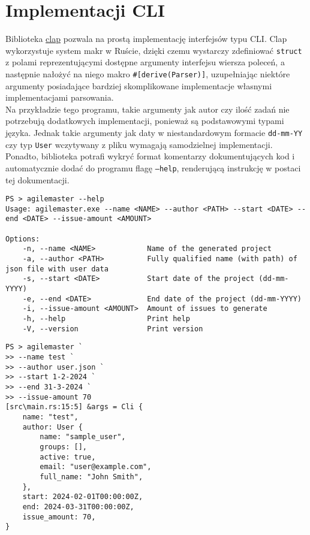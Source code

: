\section{Implementacji CLI}
Biblioteka \href{https://docs.rs/clap/latest/clap/}{clap} pozwala na prostą implementację interfejsów typu CLI.
Clap wykorzystuje system makr w Ruście, dzięki czemu wystarczy zdefiniować \texttt{struct} z polami reprezentującymi
dostępne argumenty interfejsu wiersza poleceń, a następnie nałożyć na niego makro \texttt{\#[derive(Parser)]}, uzupełniając niektóre
argumenty posiadające bardziej skomplikowane implementacje własnymi implementacjami parsowania.\\
Na przykładzie tego programu, takie argumenty jak autor czy ilość zadań nie potrzebują dodatkowych implementacji, ponieważ są podstawowymi typami języka.
Jednak takie argumenty jak daty w niestandardowym formacie \texttt{dd-mm-YY} czy typ \texttt{User} wczytywany z pliku wymagają
samodzielnej implementacji.\\
Ponadto, biblioteka potrafi wykryć format komentarzy dokumentujących kod i automatycznie dodać do programu flagę \texttt{--help}, renderującą instrukcję
w postaci tej dokumentacji.\\

\begin{lstlisting}[caption=Instrukcja użycia CLI programu]
PS > agilemaster --help
Usage: agilemaster.exe --name <NAME> --author <PATH> --start <DATE> --end <DATE> --issue-amount <AMOUNT>

Options:
    -n, --name <NAME>            Name of the generated project
    -a, --author <PATH>          Fully qualified name (with path) of json file with user data
    -s, --start <DATE>           Start date of the project (dd-mm-YYYY)
    -e, --end <DATE>             End date of the project (dd-mm-YYYY)
    -i, --issue-amount <AMOUNT>  Amount of issues to generate
    -h, --help                   Print help
    -V, --version                Print version
\end{lstlisting}

\begin{lstlisting}[caption=Przykład użycia programu]
PS > agilemaster `
>> --name test `
>> --author user.json `
>> --start 1-2-2024 `
>> --end 31-3-2024 `
>> --issue-amount 70
[src\main.rs:15:5] &args = Cli {
    name: "test",
    author: User {
        name: "sample_user",
        groups: [],
        active: true,
        email: "user@example.com",
        full_name: "John Smith",
    },
    start: 2024-02-01T00:00:00Z,
    end: 2024-03-31T00:00:00Z,
    issue_amount: 70,
}
\end{lstlisting}
